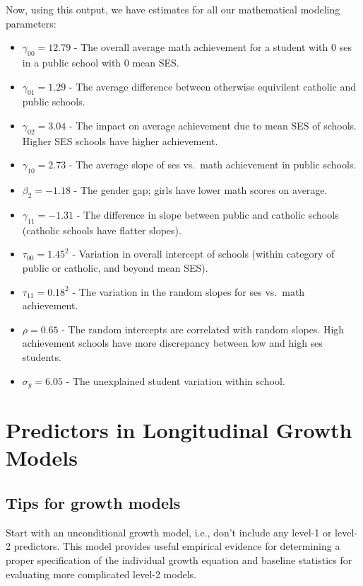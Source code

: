 \documentclass[
  letterpaper,
  DIV=11,
  numbers=noendperiod]{scrreprt}
\providecommand{\tightlist}{%
  \setlength{\itemsep}{0pt}\setlength{\parskip}{0pt}}\usepackage{longtable,booktabs,array}
\begin{document}
Now, using this output, we have estimates for all our mathematical
modeling parameters:

\begin{itemize}
\tightlist
\item
  \(\gamma_{00} = 12.79\) - The overall average math achievement for a
  student with 0 ses in a public school with 0 mean SES.
\item
  \(\gamma_{01} = 1.29\) - The average difference between otherwise
  equivilent catholic and public schools.
\item
  \(\gamma_{02} = 3.04\) - The impact on average achievement due to mean
  SES of schools. Higher SES schools have higher achievement.
\item
  \(\gamma_{10} = 2.73\) - The average slope of ses vs.~math achievement
  in public schools.
\item
  \(\beta_2 = -1.18\) - The gender gap; girls have lower math scores on
  average.
\item
  \(\gamma_{11} = -1.31\) - The difference in slope between public and
  catholic schools (catholic schools have flatter slopes).
\item
  \(\tau_{00} = 1.45^2\) - Variation in overall intercept of schools
  (within category of public or catholic, and beyond mean SES).
\item
  \(\tau_{11} = 0.18^2\) - The variation in the random slopes for ses
  vs.~math achievement.
\item
  \(\rho = 0.65\) - The random intercepts are correlated with random
  slopes. High achievement schools have more discrepancy between low and
  high ses students.
\item
  \(\sigma_y = 6.05\) - The unexplained student variation within school.
\end{itemize}

\chapter{Predictors in Longitudinal Growth
Models}\label{predictors-in-longitudinal-growth-models}

\section{Tips for growth models}\label{tips-for-growth-models}

Start with an unconditional growth model, i.e., don't include any
level-1 or level-2 predictors. This model provides useful empirical
evidence for determining a proper specification of the individual growth
equation and baseline statistics for evaluating more complicated level-2
models.
\end{document}

